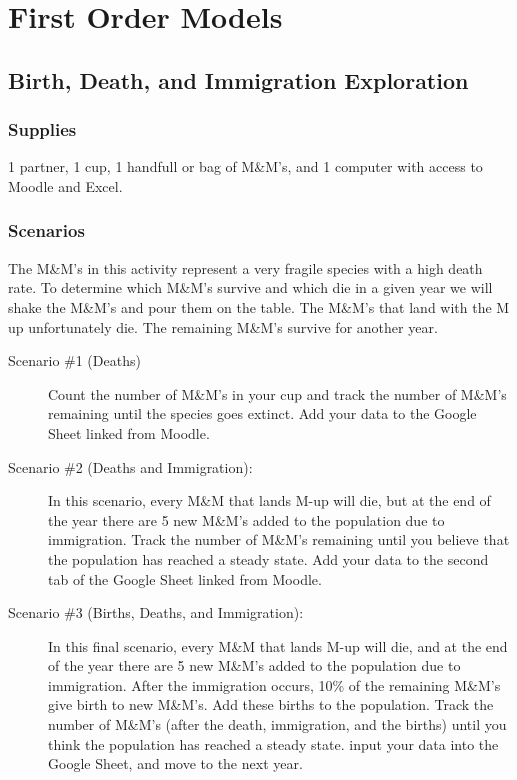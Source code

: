 \chapter{First Order Models}

\section{Birth, Death, and Immigration Exploration}
\subsection*{Supplies}
1 partner, 1 cup, 1 handfull or bag of M\&M's, and 1 computer with access to Moodle and
Excel.
\subsection*{Scenarios}
The M\&M's in this activity represent a very fragile species with a high death rate.  To
determine which M\&M's survive and which die in a given year we will shake the M\&M's and
pour them on the table.  The M\&M's that land with the M up unfortunately die.  The
remaining M\&M's survive for another year.
\begin{description}
    \item[Scenario \#1 (Deaths)] Count the number of M\&M's in your cup and track the
        number of M\&M's remaining  until the species goes extinct.  Add your data to the
        Google Sheet linked from Moodle.
    \item[Scenario \#2 (Deaths and Immigration):] In this scenario, every M\&M that lands
        M-up will die, but at the end of the year there are 5 new M\&M's added to the
        population due to immigration. Track the number of M\&M's remaining until you
        believe that the population has reached a steady state.  Add your data to the
        second tab of the Google Sheet linked from Moodle.
    \item[Scenario \#3 (Births, Deaths, and Immigration):] In this final scenario, every
        M\&M that lands M-up will die, and at the end of the year there are 5 new M\&M's
        added to the population due to immigration.  After the immigration occurs, 10\% of
        the remaining M\&M's give birth to new M\&M's.  Add these births to the
        population.  Track the number of M\&M's (after the death, immigration, and the
        births) until you think the population has reached a steady state.  input your
        data into the Google Sheet, and move to the next year.  
\end{description}

